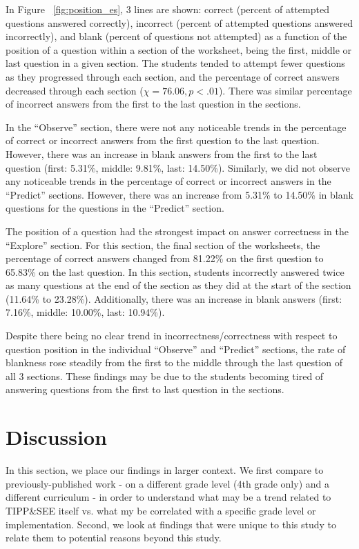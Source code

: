 \documentclass[sigconf,manuscript,review,anonymous]{acmart} %
\def\ts{TIPP\&SEE}
\begin{document}
In Figure ~\ref{fig:position_es}, 3 lines are shown: correct (percent of attempted questions answered correctly), incorrect (percent of attempted questions answered incorrectly), and blank (percent of questions not attempted) as a function of the position of a question within a section of the worksheet, being the first, middle or last question in a given section. The students tended to attempt fewer questions as they progressed through each section, and the percentage of correct answers decreased through each section (\begin{math}\chi=76.06, p<.01\end{math}). There was similar percentage of incorrect answers from the first to the last question in the sections.

In the ``Observe'' section, there were not any noticeable trends in the percentage of correct or incorrect answers from the first question to the last question. However, there was an increase in blank answers from the first to the last question (first: 5.31\%, middle: 9.81\%, last: 14.50\%). Similarly, we did not observe any noticeable trends in the percentage of correct or incorrect answers in the ``Predict'' sections. However, there was an increase from 5.31\% to 14.50\% in blank questions for the questions in the ``Predict'' section.

The position of a question had the strongest impact on answer correctness in the ``Explore'' section. For this section, the final section of the worksheets, the percentage of correct answers changed from 81.22\% on the first question to 65.83\% on the last question. In this section, students incorrectly answered twice as many questions at the end of the section as they did at the start of the section (11.64\% to 23.28\%). Additionally, there was an increase in blank answers (first: 7.16\%, middle: 10.00\%, last: 10.94\%).

Despite there being no clear trend in incorrectness/correctness with respect to question position in the individual ``Observe'' and ``Predict'' sections, the rate of blankness rose steadily from the first to the middle through the last question of all 3 sections. These findings may be due to the students becoming tired of answering questions from the first to last question in the sections.%

\section{Discussion}
\label{sec:discussion}
In this section, we place our findings in larger context. We first compare to previously-published work - on a different grade level (4th grade only) and a different curriculum - in order to understand what may be a trend related to \ts{} itself vs. what my be correlated with a specific grade level or implementation. Second, we look at findings that were unique to this study to relate them to potential reasons beyond this study.
\end{document}
